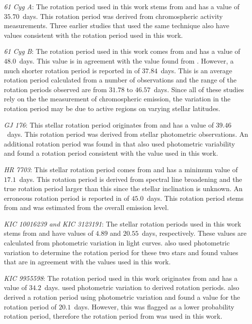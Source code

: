 \textit{61 Cyg A}: The rotation period used in this work stems from \citet{Boro_Saikia_etal_2016} and has a value of $35.70$~days. This rotation period was derived from chromospheric activity measurements. Three earlier studies that used the same technique \citep{Vaughan_etal_1981,Hallam_Wolff_1981,Donahue_etal_1996} also have values consistent with the rotation period used in this work.

\textit{61 Cyg B}: The rotation period used in this work comes from \citet{Vaughan_etal_1981} and has a value of $48.0$~days. This value is in agreement with the value found from \citet{Hallam_Wolff_1981}. However, a much shorter rotation period is reported in \citet{Donahue_etal_1996} of $37.84$~days. This is an average rotation period calculated from a number of observations and the range of the rotation periods observed are from $31.78$ to $46.57$~days. Since all of these studies rely on the the measurement of chromospheric emission, the variation in the rotation period may be due to active regions on varying stellar latitudes.

\textit{GJ 176}: This stellar rotation period originates from \citet{Robertson_etal_2015_GJ176} and has a value of $39.46$~days. This rotation period was derived from stellar photometric observations. An additional rotation period was found in \citet{Kiraga_Stepien_2007} that also used photometric variability and found a rotation period consistent with the value used in this work.

\textit{HR 7703}: This stellar rotation period comes from \citet{Ammler_vonEiff_Reiners_2012} and has a minimum value of $17.1$~days. This rotation period is derived from spectral line broadening and the true rotation period larger than this since the stellar inclination is unknown. An erroneous rotation period is reported in \citet{Pizzolato_etal_2003} of $45.0$~days. This rotation period stems from \citet{Saar_etal_1997} and was estimated from the overall \caII emission level.

\textit{KIC 10016239 and KIC 3123191}: The stellar rotation periods used in this work stems from \citet{McQuillan_etal_2014} and have values of $4.89$ and $20.55$~days, respectively. These values are calculated from photometric variation in light curves. \citet{Garcia_etal_2014} also used photometric variation to determine the rotation period for these two stars and found values that are in agreement with the values used in this work.

\textit{KIC 9955598}: The rotation period used in this work originates from \citet{Garcia_etal_2014} and has a value of $34.2$~days. \citet{Garcia_etal_2014} used photometric variation to derived rotation periods. \citet{Paz_Chinchon_etal_2015} also derived a rotation period using photometric variation and found a value for the rotation period of $20.1$~days. However, this was flagged as a lower probability rotation period, therefore the rotation period from \citet{Garcia_etal_2014} was used in this work. 

